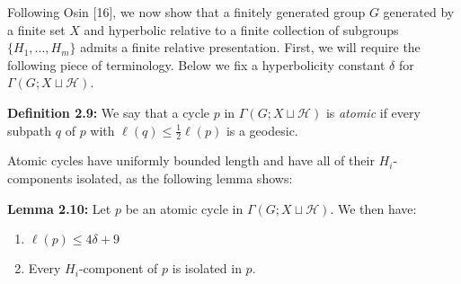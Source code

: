 \documentclass[12pt]{article}
\newcommand{\vs}{\vskip10pt}
\begin{document}
	\vs 
	
	Following Osin [16], we now show that a finitely generated group $G$ generated by a finite set $X$ and hyperbolic relative to a finite collection of subgroups $\{H_1,...,H_m\}$ admits a finite relative presentation. First, we will require the following piece of terminology. Below we fix a hyperbolicity constant $\delta$ for $\Gamma(G; X \sqcup \mathcal{H})$. 
	
	\vs
	
	\textbf{Definition 2.9: } We say that a cycle $p$ in $\Gamma(G; X \sqcup \mathcal{H})$ is \textit{atomic} if every subpath $q$ of $p$ with $\ell(q) \leq \frac{1}{2} \ell(p)$ is a geodesic. 
	
	\vs
	
	Atomic cycles have uniformly bounded length and have all of their $H_i$-components isolated, as the following lemma shows: 
	
	\vs 
	
	\textbf{Lemma 2.10: } Let $p$ be an atomic cycle in $\Gamma(G; X \sqcup \mathcal{H})$. We then have: 
	
	\begin{enumerate}[label = (\roman*)]
		\item $\ell(p) \leq 4 \delta + 9$
		\item Every $H_i$-component of $p$ is isolated in $p$. 
	\end{enumerate}
\end{document}
